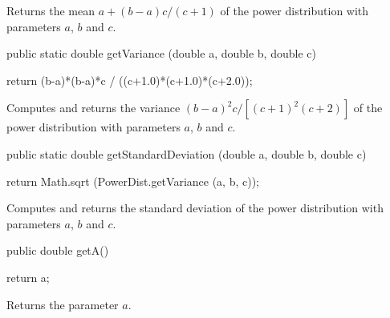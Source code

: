 \begin{tabb} Returns the mean $a + (b-a)c/(c+1)$ of the power distribution
with parameters  $a$, $b$ and $c$.
\end{tabb}
\begin{htmlonly}
\end{htmlonly}
\begin{code}

   public static double getVariance (double a, double b, double c)\begin{hide} {
      return (b-a)*(b-a)*c / ((c+1.0)*(c+1.0)*(c+2.0));
   }\end{hide}
\end{code}
\begin{tabb}  Computes and returns the variance $(b-a)^2 c / [(c+1)^2(c+2)]$
   of the power distribution with parameters $a$, $b$ and $c$.
\end{tabb}
\begin{htmlonly}
\end{htmlonly}
\begin{code}

   public static double getStandardDeviation (double a, double b, double c)\begin{hide} {
      return Math.sqrt (PowerDist.getVariance (a, b, c));
   }\end{hide}
\end{code}
\begin{tabb}  Computes and returns the standard deviation
   of the power distribution with parameters $a$, $b$ and $c$.
\end{tabb}
\begin{htmlonly}
\end{htmlonly}
\begin{code}

   public double getA()\begin{hide} {
      return a;
   }\end{hide}
\end{code} 
  \begin{tabb} Returns the parameter $a$.
  \end{tabb}
\begin{htmlonly}
\end{htmlonly}
